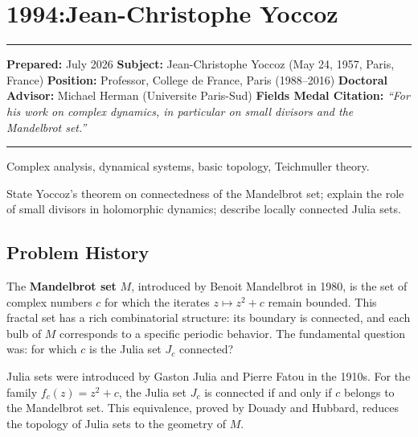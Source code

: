 \chapter{1994:Jean-Christophe Yoccoz}\label{ch1994jeanchristopheyoccoz:jean-christophe-yoccoz-fields-medal-1994-a-comprehensive-report-on-his-work-and-impact}

\begin{center}\rule{0.5\linewidth}{0.5pt}\end{center}

\textbf{Prepared:} July 2026
\textbf{Subject:} Jean-Christophe Yoccoz (May 24, 1957, Paris, France)
\textbf{Position:} Professor, College de France, Paris (1988--2016)
\textbf{Doctoral Advisor:} Michael Herman (Universite Paris-Sud)
\textbf{Fields Medal Citation:} \emph{``For his work on complex dynamics,
in particular on small divisors and the Mandelbrot set.''}

\begin{center}\rule{0.5\linewidth}{0.5pt}\end{center}

\begin{prereqs}
Complex analysis, dynamical systems, basic topology,
Teichmuller theory.
\end{prereqs}

\begin{objectives}
State Yoccoz's theorem on connectedness of the Mandelbrot set;
explain the role of small divisors in holomorphic dynamics;
describe locally connected Julia sets.
\end{objectives}

\section{Problem History}

The \textbf{Mandelbrot set} $M$, introduced by Benoit Mandelbrot in
1980, is the set of complex numbers $c$ for which the iterates
$z \mapsto z^2 + c$ remain bounded.  This fractal set has a rich
combinatorial structure: its boundary is connected, and each bulb
of $M$ corresponds to a specific periodic behavior.  The
fundamental question was: for which $c$ is the Julia set $J_c$
connected?

Julia sets were introduced by Gaston Julia and Pierre Fatou in the
1910s.  For the family $f_c(z) = z^2 + c$, the Julia set $J_c$ is
connected if and only if $c$ belongs to the Mandelbrot set.  This
equivalence, proved by Douady and Hubbard, reduces the topology of
Julia sets to the geometry of $M$.

